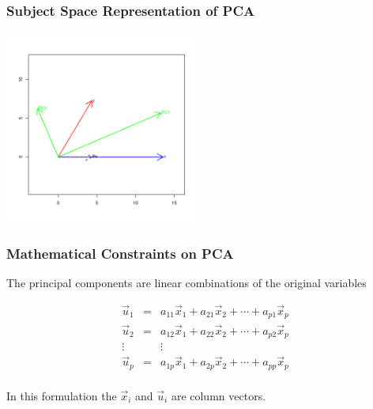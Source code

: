 \documentclass{beamer}
\begin{document}
\begin{frame}
  \frametitle{Subject Space Representation of PCA}

\begin{center}
\includegraphics[height=2.5in]{fig-bivariate-pca-vectors.pdf}
\smallskip


\end{center}  

\end{frame}


\begin{frame}
  \frametitle{Mathematical Constraints on PCA}

The principal components are linear combinations of the original variables
\smallskip

\[ \begin{array}{ccc}
\vec{u}_1 & = & a_{11}\vec{x}_1 + a_{21}\vec{x}_2 + \cdots + a_{p1}\vec{x}_p \\
\vec{u}_2 & = & a_{12}\vec{x}_1 + a_{22}\vec{x}_2 + \cdots + a_{p2}\vec{x}_p \\
\vdots & & \vdots \\
\vec{u}_p & = & a_{1p}\vec{x}_1 + a_{2p}\vec{x}_2 + \cdots + a_{pp}\vec{x}_p \\
\end{array}
\]

\bigskip

In this formulation the $\vec{x}_i$ and $\vec{u}_i$ are column vectors.
\end{frame}
\end{document}
